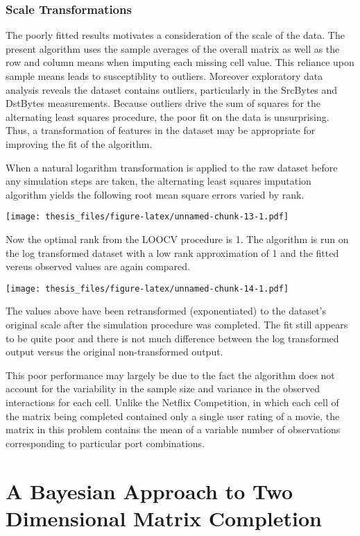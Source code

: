 \documentclass[12pt,twoside]{dukestatscithesis}
\theoremstyle{definition}
\theoremstyle{definition}
\theoremstyle{definition}
\theoremstyle{remark}
\begin{document}
\subsection{Scale Transformations}\label{scale-transformations}

The poorly fitted results motivates a consideration of the scale of the
data. The present algorithm uses the sample averages of the overall
matrix as well as the row and column means when imputing each missing
cell value. This reliance upon sample means leads to susceptiblity to
outliers. Moreover exploratory data analysis reveals the dataset
contains outliers, particularly in the SrcBytes and DstBytes
measurements. Because outliers drive the sum of squares for the
alternating least squares procedure, the poor fit on the data is
unsurprising. Thus, a transformation of features in the dataset may be
appropriate for improving the fit of the algorithm.

When a natural logarithm transformation is applied to the raw dataset
before any simulation steps are taken, the alternating least squares
imputation algorithm yields the following root mean square errors varied
by rank.

\texttt{[image: thesis\_files/figure-latex/unnamed-chunk-13-1.pdf]}

Now the optimal rank from the LOOCV procedure is 1. The algorithm is run
on the log transformed dataset with a low rank approximation of 1 and
the fitted vereus observed values are again compared.

\texttt{[image: thesis\_files/figure-latex/unnamed-chunk-14-1.pdf]}

The values above have been retransformed (exponentiated) to the
dataset's original scale after the simulation procedure was completed.
The fit still appears to be quite poor and there is not much difference
between the log transformed output versus the original non-transformed
output.

This poor performance may largely be due to the fact the algorithm does
not account for the variability in the sample size and variance in the
observed interactions for each cell. Unlike the Netflix Competition, in
which each cell of the matrix being completed contained only a single
user rating of a movie, the matrix in this problem contains the mean of
a variable number of observations corresponding to particular port
combinations.

\chapter{A Bayesian Approach to Two Dimensional Matrix
Completion}\label{a-bayesian-approach-to-two-dimensional-matrix-completion}
\end{document}
